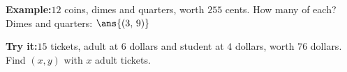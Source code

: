 \documentclass[12pt]{article}
\begin{document}
\begin{examplebox}
\textbf{Example:}\quad $12$ coins, dimes and quarters, worth $255$ cents. How many of each?
Dimes and quarters: $\ans{(3,\,9)}$
\end{examplebox}

\begin{tryitbox}
\textbf{Try it:}\quad $15$ tickets, adult at $6$ dollars and student at $4$
dollars, worth $76$ dollars. Find $(x, y)$ with $x$ adult tickets.\\[2pt]
\end{tryitbox}
\end{document}

